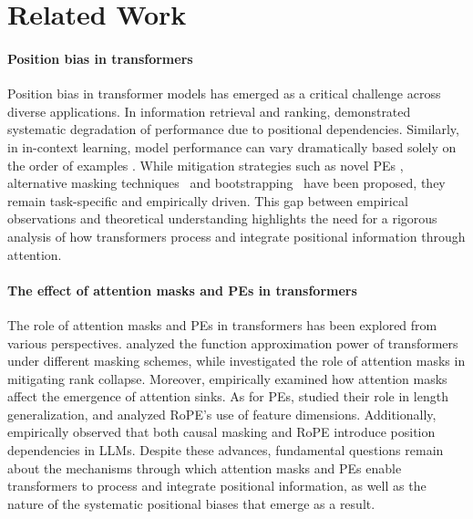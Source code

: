 \section{Related Work}
\paragraph{Position bias in transformers}
Position bias in transformer models has emerged as a critical challenge across diverse applications. In information retrieval and ranking, \citet{liu2024lost, Guo2024SerialPE, Hou2023LargeLM, Zheng2023JudgingLW} demonstrated systematic degradation of performance due to positional dependencies. Similarly, in in-context learning, model performance can vary dramatically based solely on the order of examples \cite{Lu2021FantasticallyOP, Min2022RethinkingTR, zhao2021calibrateuseimprovingfewshot, Fan2025InvICL}. While mitigation strategies such as novel PEs  \cite{Kazemnejad2023TheIO, Zhang2024FoundIT}, alternative masking techniques~\cite{Wang2024EliminatingPB,Fan2025InvICL} and bootstrapping~\cite{Hou2023LargeLM} have been proposed, they remain task-specific and empirically driven. This gap between empirical observations and theoretical understanding highlights the need for a rigorous analysis of how transformers process and integrate positional information through attention.


\paragraph{The effect of attention masks and PEs in transformers} 
The role of attention masks and PEs in transformers has been explored from various perspectives. \citet{Yun2020OnCA} analyzed the function approximation power of transformers under different masking schemes, while \citet{Wu2024OnTR, Wu2023Demystify} investigated the role of attention masks in mitigating rank collapse. Moreover, \citet{Gu2024WhenAS} empirically examined how attention masks affect the emergence of attention sinks. As for PEs, \citet{Kazemnejad2023TheIO} studied their role in length generalization, and \citet{Barbero2024RoundAR} analyzed RoPE’s use of feature dimensions. Additionally, \citet{Wang2024EliminatingPB} empirically observed that both causal masking and RoPE introduce position dependencies in LLMs. Despite these advances, fundamental questions remain about the mechanisms through which attention masks and PEs enable transformers to process and integrate positional information, as well as the nature of the systematic positional biases that emerge as a result.